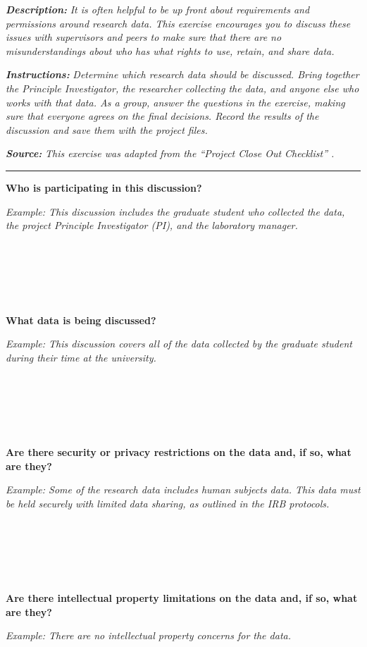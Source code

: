 \documentclass[
]{book}
\begin{document}
\textbf{\emph{Description:}} \emph{It is often helpful to be up front about requirements and permissions around research data. This exercise encourages you to discuss these issues with supervisors and peers to make sure that there are no misunderstandings about who has what rights to use, retain, and share data.}

\textbf{\emph{Instructions:}} \emph{Determine which research data should be discussed. Bring together the Principle Investigator, the researcher collecting the data, and anyone else who works with that data. As a group, answer the questions in the exercise, making sure that everyone agrees on the final decisions. Record the results of the discussion and save them with the project files.}

\textbf{\emph{Source:}} \emph{This exercise was adapted from the ``Project Close Out Checklist'' \citep{briney_project_2020}.}

\begin{center}\rule{0.5\linewidth}{0.5pt}\end{center}

\textbf{Who is participating in this discussion?}

\emph{Example: This discussion includes the graduate student who collected the data, the project Principle Investigator (PI), and the laboratory manager.}

~

~

~

\textbf{What data is being discussed?}

\emph{Example: This discussion covers all of the data collected by the graduate student during their time at the university.}

~

~

~

\textbf{Are there security or privacy restrictions on the data and, if so, what are they?}

\emph{Example: Some of the research data includes human subjects data. This data must be held securely with limited data sharing, as outlined in the IRB protocols.}

~

~

~

\textbf{Are there intellectual property limitations on the data and, if so, what are they?}

\emph{Example: There are no intellectual property concerns for the data.}
\end{document}
